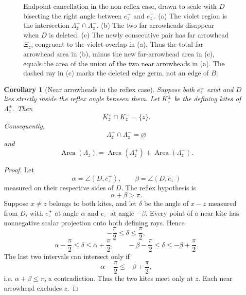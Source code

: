 \documentclass[11pt]{article}
\newtheorem{corollary}[theorem]{Corollary}
\newcommand{\Area}{\operatorname{Area}}
\numberwithin{equation}{section}
\begin{document}
\begin{figure}[htbp]
\caption{Endpoint cancellation in the non-reflex case, drawn to scale with $D$ bisecting the right angle between $e_z^+$ and $e_z^-$. (a) The violet region is the intersection $\Lambda_z^+\cap\Lambda_z^-$. (b) The two far arrowheads disappear when $D$ is deleted. (c) The newly consecutive pair has far arrowhead $\Xi_z$, congruent to the violet overlap in (a). Thus the total far-arrowhead area in (b), minus the new far-arrowhead area in (c), equals the area of the union of the two near arrowheads in (a). The dashed ray in (c) marks the deleted edge germ, not an edge of $B$.}
\label{fig:endpoint-cancellation}
\end{figure}

\begin{corollary}[Near arrowheads in the reflex case]\label{cor:reflex-near-disjoint}
Suppose both $e_z^\pm$ exist and $D$ lies strictly inside the reflex angle between them. Let $K_z^\pm$ be the defining kites of $\Lambda_z^\pm$. Then
\[
\boxed{K_z^+\cap K_z^-=\{z\}.}
\]
Consequently,
\[
\boxed{\Lambda_z^+\cap\Lambda_z^-=\varnothing}
\]
and
\[
\Area(\Lambda_z)=\Area(\Lambda_z^+)+\Area(\Lambda_z^-).
\]
\end{corollary}

\begin{proof}
Let
\[
\alpha=\angle(D,e_z^+),
\qquad
\beta=\angle(D,e_z^-)
\]
measured on their respective sides of $D$. The reflex hypothesis is
\[
\alpha+\beta>\pi.
\]
Suppose $x\ne z$ belongs to both kites, and let $\delta$ be the angle of $x-z$ measured from $D$, with $e_z^+$ at angle $\alpha$ and $e_z^-$ at angle $-\beta$. Every point of a near kite has nonnegative scalar projection onto both defining rays. Hence
\[
-\frac\pi2\le\delta\le\frac\pi2,
\]
\[
\alpha-\frac\pi2\le\delta\le\alpha+\frac\pi2,
\qquad
-\beta-\frac\pi2\le\delta\le-\beta+\frac\pi2.
\]
The last two intervals can intersect only if
\[
\alpha-\frac\pi2\le-\beta+\frac\pi2,
\]
i.e. $\alpha+\beta\le\pi$, a contradiction. Thus the two kites meet only at $z$. Each near arrowhead excludes $z$.
\end{proof}
\end{document}

